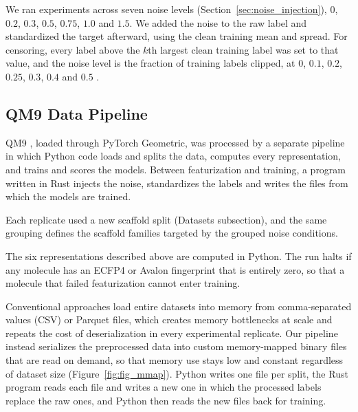 We ran experiments across seven noise levels (Section~\ref{sec:noise_injection}), $0$, $0.2$, $0.3$, $0.5$, $0.75$, $1.0$ and $1.5$. We added the noise to the raw label and standardized the target afterward, using the clean training mean and spread. For censoring, every label above the $k$th largest clean training label was set to that value, and the noise level is the fraction of training labels clipped, at $0$, $0.1$, $0.2$, $0.25$, $0.3$, $0.4$ and $0.5$ \citep{Svensson2025}.


\subsection{QM9 Data Pipeline}

QM9 \citep{Ramakrishnan2014}, loaded through PyTorch Geometric, was processed by a separate pipeline
in which Python code loads and splits the data, computes every representation, and trains and scores
the models. Between featurization and training, a program written in Rust injects the noise,
standardizes the labels and writes the files from which the models are trained.

Each replicate used a new scaffold split (Datasets subsection), and the same grouping defines the scaffold families targeted by the grouped noise conditions.

The six representations described above are computed in Python. The run halts if any molecule has an ECFP4 or Avalon fingerprint
that is entirely zero, so that a molecule that failed featurization cannot enter training.

Conventional approaches load entire datasets into memory from comma-separated values (CSV) or Parquet files, which creates memory bottlenecks at scale and repeats the cost of deserialization in every experimental replicate. Our pipeline instead serializes the preprocessed data into custom memory-mapped binary files that are read on demand, so that memory use stays low and constant regardless of dataset size (Figure~\ref{fig:fig_mmap}). Python writes one file per split, the Rust program reads each file and writes a new one in which the processed labels replace the raw ones, and Python then reads the new files back for training.


